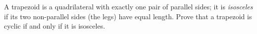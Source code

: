 A trapezoid is a quadrilateral with exactly one pair of parallel sides; it is \emph{isosceles} if its two non-parallel sides (the legs) have equal length. Prove that a trapezoid is cyclic if and only if it is isosceles.
